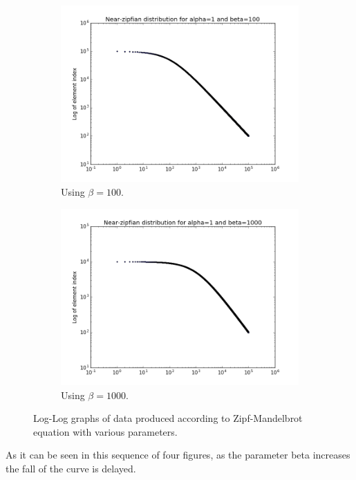 \begin{figure}[ht]
    \begin{subfigure}{0.475\textwidth}
    \centering
    \includegraphics[width=0.9\linewidth]{Cap2/zipf100}
    \caption{Using \(\beta = 100\).}
    \label{fig:zipf100}
    \end{subfigure}
    \begin{subfigure}{0.475\textwidth}
    \centering
    \includegraphics[width=0.9\linewidth]{Cap2/zipf1000}
    \caption{Using \(\beta = 1000\).}
    \label{fig:zipf1000}
    \end{subfigure}
    
    \caption{Log-Log graphs of data produced according to Zipf-Mandelbrot equation with various parameters.}
    \label{fig:mandelbrotbeta}
\end{figure}

As it can be seen in this sequence of four figures, as the parameter beta increases the fall of the curve is delayed.

